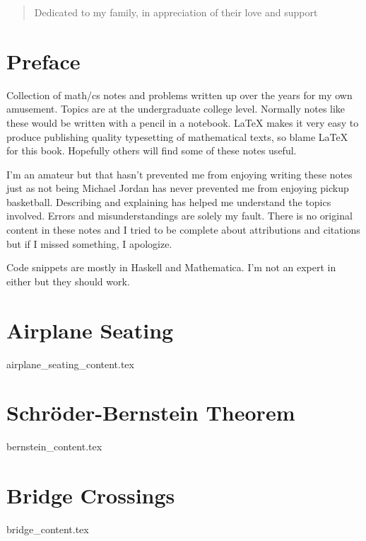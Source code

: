 \documentclass[justified, openany]{tufte-book}
\theoremstyle{plain}%
\theoremstyle{definition}
\theoremstyle{remark}
\newenvironment{dedication}
    {\vspace{6ex}\begin{quotation}\begin{center}\begin{em}\begin{large}}
    {\par\end{large}\end{em}\end{center}\end{quotation}}
\begin{document}
\newpage
\begin{fullwidth}
\thispagestyle{empty}
\begin{dedication}
Dedicated to my family, in appreciation of their love and support
\end{dedication}
\end{fullwidth}

\chapter{Preface}

Collection of math/cs notes and problems written up over the years for my own amusement. Topics are at the undergraduate college level. Normally notes like these would be written with a pencil in a notebook. LaTeX makes it very easy to produce publishing quality typesetting of mathematical texts, so blame LaTeX for this book. Hopefully others will find some of these notes useful.

I'm an amateur but that hasn't prevented me from enjoying writing these notes just as not being Michael Jordan has never prevented me from enjoying pickup basketball. Describing and explaining has helped me understand the topics involved. Errors and misunderstandings are solely my fault. There is no original content in these notes and I tried to be complete about attributions and citations but if I missed something, I apologize.

Code snippets are mostly in Haskell and Mathematica. I'm not an expert in either but they should work.

\tableofcontents
\cleardoublepage
\mainmatter

\clearpage
\chapter{Airplane Seating}
{airplane_seating_content.tex}

\clearpage
\chapter{Schr\"oder-Bernstein Theorem}
{bernstein_content.tex}

\clearpage
\chapter{Bridge Crossings}
{bridge_content.tex}

\clearpage
\end{document}
